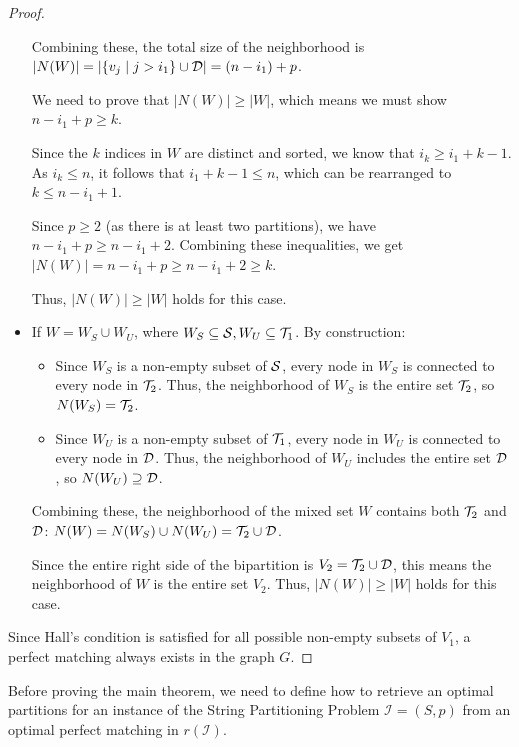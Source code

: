 \begin{proof}
\begin{itemize}[leftmargin=25pt]
        Combining these, the total size of the neighborhood is $|N(W)| = |\{v_j \mid j > i_1\} \cup \mathcal{D}| = (n - i_1) + p$.
        
        We need to prove that $|N(W)| \ge |W|$, which means we must show $n - i_1 + p \ge k$.
        
        Since the $k$ indices in $W$ are distinct and sorted, we know that $i_k \ge i_1 + k - 1$. As $i_k \le n$, it follows that $i_1 + k - 1 \le n$, which can be rearranged to $k \le n - i_1 + 1$.
        
        Since $p \ge 2$ (as there is at least two partitions), we have $n - i_1 + p \ge n - i_1 + 2$.
        Combining these inequalities, we get $|N(W)| = n - i_1 + p \ge n - i_1 + 2 \ge k$.
        
        Thus, $|N(W)| \ge |W|$ holds for this case. 
        
        \item If $W=W_S \cup W_U$, where $W_S \subseteq \mathcal{S}, W_U \subseteq \mathcal{T}_{1}$. By construction:
        \begin{itemize}
            \item Since $W_S$ is a non-empty subset of $\mathcal{S}$, every node in $W_S$ is connected to every node in $\mathcal{T}_{2}$. Thus, the neighborhood of $W_S$ is the entire set $\mathcal{T}_{2}$, so $N(W_S) = \mathcal{T}_{2}$.
            \item Since $W_U$ is a non-empty subset of $\mathcal{T}_{1}$, every node in $W_U$ is connected to every node in $\mathcal{D}$. Thus, the neighborhood of $W_U$ includes the entire set $\mathcal{D}$, so $N(W_U) \supseteq \mathcal{D}$.
        \end{itemize}
        
        Combining these, the neighborhood of the mixed set $W$ contains both $\mathcal{T}_{2}$ and $\mathcal{D}$:
        $N(W) = N(W_S) \cup N(W_U) = \mathcal{T}_{2} \cup \mathcal{D}$.
        
        Since the entire right side of the bipartition is $V_2 = \mathcal{T}_{2} \cup \mathcal{D}$, this means the neighborhood of $W$ is the entire set $V_2$. Thus, $|N(W)| \ge |W|$ holds for this case. 
    \end{itemize}
    Since Hall's condition is satisfied for all possible non-empty subsets of $V_1$, a perfect matching always exists in the graph $G$.
\end{proof}

Before proving the main theorem, we need to define how to retrieve an optimal partitions for an instance of the String Partitioning Problem $\mathcal{I}=(S, p)$ from an optimal perfect matching in $r(\mathcal{I})$.

